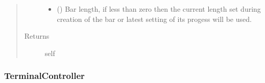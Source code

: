 \documentclass[a4paper,10pt,english]{sphinxmanual}
\begin{document}
\begin{fulllineitems}
\begin{fulllineitems}
\begin{quote}
\begin{description}
\begin{itemize}
\item {} 
 () \textendash{} Bar length, if less than zero then the current length set during creation of the bar or
latest setting of its progess will be used.

\end{itemize}

\item[{Returns}] \leavevmode
self

\end{description}\end{quote}

\end{fulllineitems}


\end{fulllineitems}



\subsubsection{TerminalController}
\label{\detokenize{api/termtools.terminal.TerminalController::doc}}\label{\detokenize{api/termtools.terminal.TerminalController:terminalcontroller}}
\end{document}
